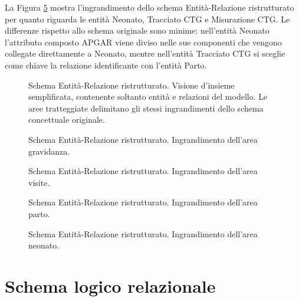 La Figura \ref{newbornrerdiagram} mostra l'ingrandimento dello schema Entità-Relazione ristrutturato per quanto riguarda le entità Neonato, Tracciato CTG e Misurazione CTG.
Le differenze rispetto allo schema originale sono minime: nell'entità Neonato l'attributo composto APGAR viene diviso nelle sue componenti che vengono collegate direttamente a Neonato, mentre nell'entità Tracciato CTG si sceglie come chiave la relazione identificante con l'entità Parto.

\begin{figure}
    \centering
    
    \caption{Schema Entità-Relazione ristrutturato. Visione d'insieme semplificata, contenente soltanto entità e relazioni del modello. Le aree tratteggiate delimitano gli stessi ingrandimenti dello schema concettuale originale.}
    \label{completererdiagram}
\end{figure}

\begin{figure}
    \centering
    
    \caption{Schema Entità-Relazione ristrutturato. Ingrandimento dell'area gravidanza.}
\label{pregnancyrerdiagram}
\end{figure}

\begin{figure}
    \centering
    
    \caption{Schema Entità-Relazione ristrutturato. Ingrandimento dell'area visite.}
\label{visitsrerdiagram}
\end{figure}

\begin{figure}
    \centering
    
    \caption{Schema Entità-Relazione ristrutturato. Ingrandimento dell'area parto.}
\label{deliveryrerdiagram}
\end{figure}

\begin{figure}
    \centering
    
    \caption{Schema Entità-Relazione ristrutturato. Ingrandimento dell'area neonato.}
\label{newbornrerdiagram}
\end{figure}

\newpage

\newcommand{\at}[1]{\texttt{#1}}
\newcommand{\tab}[1]{\texttt{#1}}
\newcommand{\val}[1]{\texttt{#1}}

\section{Schema logico relazionale}
\label{logical}

